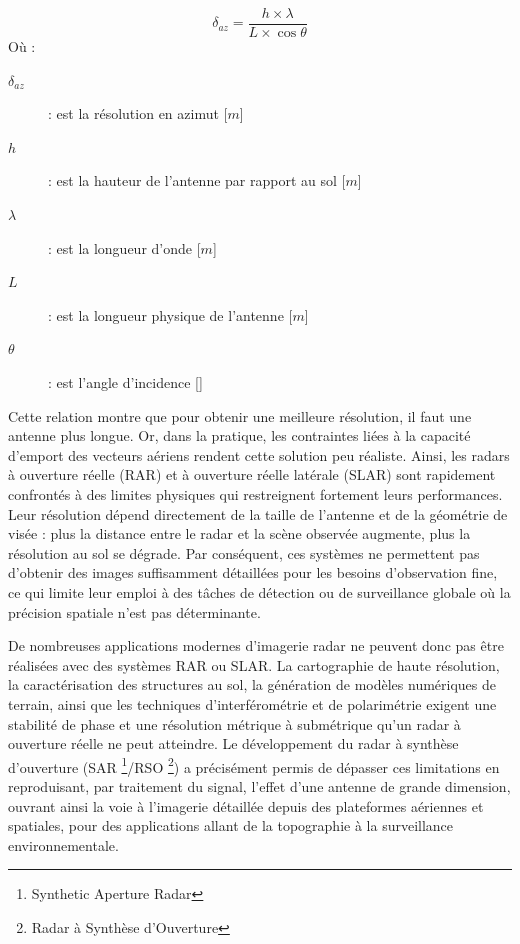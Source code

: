 \begin{equation}
\delta_{az} = \frac{h\times\lambda}{L\times \cos{\theta}}
\label{eq:resolution_azimut_rar}
\end{equation}
Où :
\begin{description}
    \item[$\delta_{az}$] : est la résolution en azimut [$m$]
    \item[$h$] : est la hauteur de l'antenne par rapport au sol [$m$]
    \item[$\lambda$] : est la longueur d’onde [$m$]
    \item[$L$] : est la longueur physique de l’antenne [$m$]
    \item[$\theta$] : est l'angle d'incidence [\textdegree]
\end{description}

Cette relation montre que pour obtenir une meilleure résolution, il faut une antenne plus longue. Or, dans la pratique, les contraintes liées à la capacité d’emport des vecteurs aériens rendent cette solution peu réaliste. Ainsi, les radars à ouverture réelle (RAR) et à ouverture réelle latérale (SLAR) sont rapidement confrontés à des limites physiques qui restreignent fortement leurs performances. Leur résolution dépend directement de la taille de l’antenne et de la géométrie de visée : plus la distance entre le radar et la scène observée augmente, plus la résolution au sol se dégrade. Par conséquent, ces systèmes ne permettent pas d’obtenir des images suffisamment détaillées pour les besoins d’observation fine, ce qui limite leur emploi à des tâches de détection ou de surveillance globale où la précision spatiale n’est pas déterminante.

De nombreuses applications modernes d’imagerie radar ne peuvent donc pas être réalisées avec des systèmes RAR ou SLAR. La cartographie de haute résolution, la caractérisation des structures au sol, la génération de modèles numériques de terrain, ainsi que les techniques d’interférométrie et de polarimétrie exigent une stabilité de phase et une résolution métrique à submétrique \cite{hforsten_polarimetric_sar_drone, tupin_monradar} qu’un radar à ouverture réelle ne peut atteindre. Le développement du radar à synthèse d’ouverture (SAR \footnote{Synthetic Aperture Radar}/RSO \footnote{Radar à Synthèse d'Ouverture}) a précisément permis de dépasser ces limitations en reproduisant, par traitement du signal, l’effet d’une antenne de grande dimension, ouvrant ainsi la voie à l’imagerie détaillée depuis des plateformes aériennes et spatiales, pour des applications allant de la topographie à la surveillance environnementale.

